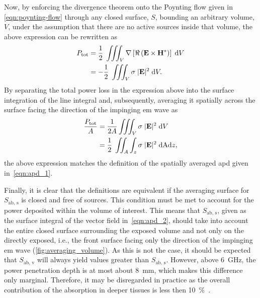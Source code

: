Now, by enforcing the divergence theorem onto the Poynting flow given in \cref{eqn:poynting-flow} through any closed surface, $S$, bounding an arbitrary volume, $V$, under the assumption that there are no active sources inside that volume, the above expression can be rewritten as
\begin{align}
    P_\text{tot} &= \frac{1}{2} \; \iiint_V \nabla \left [ \Re \left( \mathbf{E} \times \mathbf{H}^* \right) \right] \; \mathrm{d}V \notag\\
                 &= -\frac{1}{2} \; \iiint_V \sigma \; |\mathbf{E}|^2 \; \mathrm{d}V.
\end{align}
By separating the total power loss in the expression above into the surface integration of the line integral and, subsequently, averaging it spatially across the surface facing the direction of the impinging \gls{em} wave as
\begin{align}
    \frac{P_\text{tot}}{A}  &= \frac{1}{2A} \iiint_V \sigma \; |\mathbf{E}|^2 \; \mathrm{d}V \notag\\
                            &= \frac{1}{2} \; \iint_A \int_z \sigma \; |\mathbf{E}|^2 \; \mathrm{dA} \mathrm{d}z,
\end{align}
the above expression matches the definition of the spatially averaged \gls{apd} given in~\cref{eqn:apd_1}.

Finally, it is clear that the definitions are equivalent if the averaging surface for $S_\text{ab, s}$ is closed and free of sources.
This condition must be met to account for the power deposited within the volume of interest.
This means that $S_\text{ab, s}$, given as the surface integral of the vector field in~\cref{eqn:apd_2}, should take into account the entire closed surface surrounding the exposed volume and not only on the directly exposed, i.e., the front surface facing only the direction of the impinging \gls{em} wave (\cref{fig:averaging_volume}).
As this is not the case, it should be expected that $S_\text{ab, v}$ will always yield values greater than $S_\text{ab, s}$.
However, above \SI{6}{\GHz}, the power penetration depth is at most about \SI{8}{\mm}, which makes this difference only marginal.
Therefore, it may be disregarded in practice as the overall contribution of the absorption in deeper tissues is less then \SI{10}{\percent}~\cite{Li2023Calculated}.

